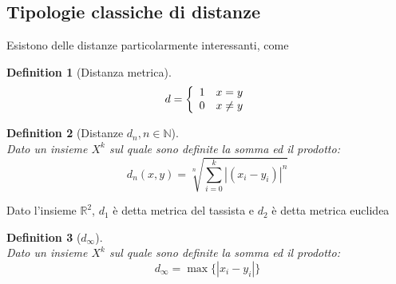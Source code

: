 \documentclass{article}
\newtheorem{definition}{Definition}[section]
\begin{document}
    \subsection{Tipologie classiche di distanze}
        Esistono delle distanze particolarmente interessanti, come 
        \begin{definition}[Distanza metrica]
            \begin{equation}
                d = \left\{\begin{array}{l l}
                        1 & x = y \\
                        0 & x \neq y \\
                \end{array}
                \right.
            \end{equation}
        \end{definition}
        \begin{definition}[Distanze $d_n, n \in \mathbb{N}$] \, \\
            Dato un insieme $X^k$ sul quale sono definite la somma ed il prodotto:
            $$d_n\left(x,y\right) = \sqrt[n]{\sum_{i=0}^k |\left(x_i - y_i\right)|^n}$$
        \end{definition}
        Dato l'insieme $\mathbb{R}^2$, $d_1$ è detta metrica del tassista e $d_2$ è detta metrica euclidea
        \begin{definition}[$d_\infty$] \, \\
            Dato un insieme $X^k$ sul quale sono definite la somma ed il prodotto:
            $$d_\infty = \max\{|x_i-y_i|\}$$
        \end{definition}
\end{document}
